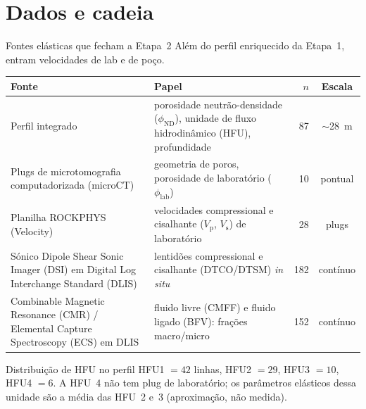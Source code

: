 \documentclass[aspectratio=169,10pt]{beamer}
\newcommand{\philab}{\ensuremath{\phi_{\mathrm{lab}}}}
\newcommand{\phiND}{\ensuremath{\phi_{\mathrm{ND}}}}
\newcommand{\Vp}{\ensuremath{V_{\mathrm{p}}}}
\newcommand{\Vs}{\ensuremath{V_{\mathrm{s}}}}
\begin{document}
\section{Dados e cadeia}

\begin{frame}{Fontes elásticas que fecham a Etapa~2}
  \footnotesize
  Além do perfil enriquecido da Etapa~1, entram velocidades de lab e de poço.
  \vspace{0.06cm}
  \centering
  \scriptsize
  \setlength{\tabcolsep}{2.5pt}
  \renewcommand{\arraystretch}{1.15}
  \begin{tabular}{@{}p{}p{}rc@{}}
    \toprule
    Fonte & Papel & $n$ & Escala \\
    \midrule
    Perfil integrado
      & porosidade neutrão-densidade (\phiND{}),
        unidade de fluxo hidrodinâmico (HFU),
        profundidade
      & 87 & $\sim$28~m \\
    Plugs de microtomografia
        computadorizada (microCT)
      & geometria de poros, porosidade de
        laboratório (\philab{})
      & 10 & pontual \\
    Planilha ROCKPHYS (Velocity)
      & velocidades compressional e
        cisalhante (\Vp{}, \Vs{}) de laboratório
      & 28 & plugs \\
    Sónico Dipole Shear Sonic Imager (DSI)
        em Digital Log Interchange
        Standard (DLIS)
      & lentidões compressional e
        cisalhante (DTCO/DTSM) \emph{in situ}
      & 182 & contínuo \\
    Combinable Magnetic Resonance (CMR) /
        Elemental Capture Spectroscopy (ECS)
        em DLIS
      & fluido livre (CMFF) e fluido ligado
        (BFV): frações macro/micro
      & 152 & contínuo \\
    \bottomrule
  \end{tabular}
  \vspace{0.10cm}
  \begin{block}{Distribuição de HFU no perfil}
    \scriptsize
    HFU1 $=42$ linhas, HFU2 $=29$, HFU3 $=10$, HFU4 $=6$.
    A HFU~4 não tem plug de laboratório; os parâmetros elásticos
    dessa unidade são a média das HFU~2 e~3 (aproximação, não medida).
  \end{block}
\end{frame}
\end{document}

